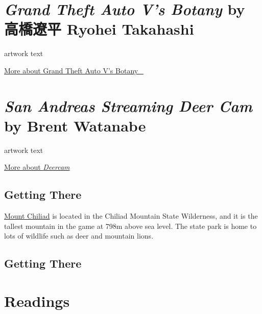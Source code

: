 \documentclass[
  openany]{book}
\begin{document}
\hypertarget{grand-theft-auto-vs-botany-by-ux9ad8ux6a4bux907cux5e73-ryohei-takahashi}{%
\section*{\texorpdfstring{\emph{Grand Theft Auto V's Botany} by 高橋遼平 Ryohei Takahashi}{Grand Theft Auto V's Botany by 高橋遼平 Ryohei Takahashi}}\label{grand-theft-auto-vs-botany-by-ux9ad8ux6a4bux907cux5e73-ryohei-takahashi}}

artwork text

\href{http://www.idd.tamabi.ac.jp/ga21005/works/GrandTheftAutoV's\%20Botany.html}{More about Grand Theft Auto V's Botany\_}

\hypertarget{san-andreas-streaming-deer-cam-by-brent-watanabe}{%
\section*{\texorpdfstring{\emph{San Andreas Streaming Deer Cam} by Brent Watanabe}{San Andreas Streaming Deer Cam by Brent Watanabe}}\label{san-andreas-streaming-deer-cam-by-brent-watanabe}}

artwork text

\href{https://bwatanabe.com/GTA_V_WanderingDeer.html}{More about \emph{Deercam}}

\hypertarget{getting-there-5}{%
\subsection*{Getting There}\label{getting-there-5}}

\href{https://grandtheftdata.com/landmarks/\#86.534,6158.577,4,atlas,name=mount_chiliad,Mount_Chiliad}{Mount Chiliad} is located in the Chiliad Mountain State Wilderness, and it is the tallest mountain in the game at 798m above sea level. The state park is home to lots of wildlife such as deer and mountain lions.

\hypertarget{getting-there-6}{%
\subsection*{Getting There}\label{getting-there-6}}

\hypertarget{readings-3}{%
\section*{Readings}\label{readings-3}}
\end{document}
